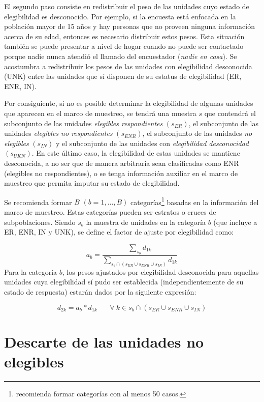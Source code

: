 \documentclass[
  12pt,
]{book}
\begin{document}
El segundo paso consiste en redistribuir el peso de las unidades cuyo estado de elegibilidad es desconocido. Por ejemplo, si la encuesta está enfocada en la población mayor de 15 años y hay personas que no proveen ninguna información acerca de su edad, entonces es necesario distribuir estos pesos. Esta situación también se puede presentar a nivel de hogar cuando no puede ser contactado porque nadie nunca atendió el llamado del encuestador (\emph{nadie en casa}). Se acostumbra a redistribuir los pesos de las unidades con elegibilidad desconocida (UNK) entre las unidades que sí disponen de su estatus de elegibilidad (ER, ENR, IN).

Por consiguiente, si no es posible determinar la elegibilidad de algunas unidades que aparecen en el marco de muestreo, se tendrá una muestra \(s\) que contendrá el subconjunto de las unidades \emph{elegibles respondientes} \((s_{ER})\), el subconjunto de las unidades \emph{elegibles no respondientes} \((s_{ENR})\), el subconjunto de las unidades \emph{no elegibles} \((s_{IN})\) y el subconjunto de las unidades con \emph{elegibilidad desconocidad} \((s_{UKN})\). En este último caso, la elegibilidad de estas unidades se mantiene desconocida, a no ser que de manera arbitraria sean clasificadas como ENR (elegibles no respondientes), o se tenga información auxiliar en el marco de muestreo que permita imputar su estado de elegibilidad.

Se recomienda formar \(B\) \((b = 1, \ldots, B)\) categorías\footnote{\citet{Valliant_Dever_2017} recomienda formar categorías con al menos 50 casos.} basadas en la información del marco de muestreo. Estas categorías pueden ser estratos o cruces de subpoblaciones. Siendo \(s_b\) la muestra de unidades en la categoría \(b\) (que incluye a ER, ENR, IN y UNK), se define el factor de ajuste por elegibilidad como:

\[
a_b = \frac{\sum_{s_b}d_{1k}}{\sum_{s_b \cap (s_{ER} \cup s_{ENR} \cup s_{IN})}d_{1k}}
\]
Para la categoría \(b\), los pesos ajustados por elegibilidad desconocida para aquellas unidades cuya elegibilidad sí pudo ser establecida (independientemente de su estado de respuesta) estarán dados por la siguiente expresión:

\[
d_{2k} = a_b * d_{1k}  \ \ \ \ \ \ \ \ \forall \ k\in s_b \cap (s_{ER} \cup s_{ENR} \cup s_{IN})
\]

\hypertarget{descarte-de-las-unidades-no-elegibles}{%
\section{Descarte de las unidades no elegibles}\label{descarte-de-las-unidades-no-elegibles}}
\end{document}
